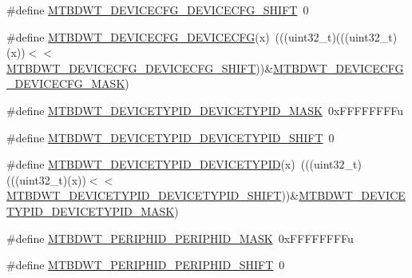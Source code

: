 \begin{DoxyCompactItemize}
\item 
\#define \hyperlink{group___m_t_b_d_w_t___register___masks_ga2194cb4b21ad650bf3957d3f95f4dbbb}{M\+T\+B\+D\+W\+T\+\_\+\+D\+E\+V\+I\+C\+E\+C\+F\+G\+\_\+\+D\+E\+V\+I\+C\+E\+C\+F\+G\+\_\+\+S\+H\+I\+FT}~0
\item 
\#define \hyperlink{group___m_t_b_d_w_t___register___masks_ga9d21c0abbf05163f867fd5f822a182bf}{M\+T\+B\+D\+W\+T\+\_\+\+D\+E\+V\+I\+C\+E\+C\+F\+G\+\_\+\+D\+E\+V\+I\+C\+E\+C\+FG}(x)~(((uint32\+\_\+t)(((uint32\+\_\+t)(x))$<$$<$\hyperlink{group___m_t_b_d_w_t___register___masks_ga2194cb4b21ad650bf3957d3f95f4dbbb}{M\+T\+B\+D\+W\+T\+\_\+\+D\+E\+V\+I\+C\+E\+C\+F\+G\+\_\+\+D\+E\+V\+I\+C\+E\+C\+F\+G\+\_\+\+S\+H\+I\+FT}))\&\hyperlink{group___m_t_b_d_w_t___register___masks_ga90daa5cb85d4d39b819f5c9bc1b20546}{M\+T\+B\+D\+W\+T\+\_\+\+D\+E\+V\+I\+C\+E\+C\+F\+G\+\_\+\+D\+E\+V\+I\+C\+E\+C\+F\+G\+\_\+\+M\+A\+SK})
\item 
\#define \hyperlink{group___m_t_b_d_w_t___register___masks_ga6986bcf237d6ff96e25d6458355ef4b8}{M\+T\+B\+D\+W\+T\+\_\+\+D\+E\+V\+I\+C\+E\+T\+Y\+P\+I\+D\+\_\+\+D\+E\+V\+I\+C\+E\+T\+Y\+P\+I\+D\+\_\+\+M\+A\+SK}~0x\+F\+F\+F\+F\+F\+F\+F\+Fu
\item 
\#define \hyperlink{group___m_t_b_d_w_t___register___masks_ga8caaff8277e4bdaee5735e22d6eb6e7c}{M\+T\+B\+D\+W\+T\+\_\+\+D\+E\+V\+I\+C\+E\+T\+Y\+P\+I\+D\+\_\+\+D\+E\+V\+I\+C\+E\+T\+Y\+P\+I\+D\+\_\+\+S\+H\+I\+FT}~0
\item 
\#define \hyperlink{group___m_t_b_d_w_t___register___masks_gaeb9942e9e9c4c3c52ef545b4d49e113d}{M\+T\+B\+D\+W\+T\+\_\+\+D\+E\+V\+I\+C\+E\+T\+Y\+P\+I\+D\+\_\+\+D\+E\+V\+I\+C\+E\+T\+Y\+P\+ID}(x)~(((uint32\+\_\+t)(((uint32\+\_\+t)(x))$<$$<$\hyperlink{group___m_t_b_d_w_t___register___masks_ga8caaff8277e4bdaee5735e22d6eb6e7c}{M\+T\+B\+D\+W\+T\+\_\+\+D\+E\+V\+I\+C\+E\+T\+Y\+P\+I\+D\+\_\+\+D\+E\+V\+I\+C\+E\+T\+Y\+P\+I\+D\+\_\+\+S\+H\+I\+FT}))\&\hyperlink{group___m_t_b_d_w_t___register___masks_ga6986bcf237d6ff96e25d6458355ef4b8}{M\+T\+B\+D\+W\+T\+\_\+\+D\+E\+V\+I\+C\+E\+T\+Y\+P\+I\+D\+\_\+\+D\+E\+V\+I\+C\+E\+T\+Y\+P\+I\+D\+\_\+\+M\+A\+SK})
\item 
\#define \hyperlink{group___m_t_b_d_w_t___register___masks_gaa49f29267dcedd6db6aafce7b226182b}{M\+T\+B\+D\+W\+T\+\_\+\+P\+E\+R\+I\+P\+H\+I\+D\+\_\+\+P\+E\+R\+I\+P\+H\+I\+D\+\_\+\+M\+A\+SK}~0x\+F\+F\+F\+F\+F\+F\+F\+Fu
\item 
\#define \hyperlink{group___m_t_b_d_w_t___register___masks_gaa9dfe45d3ebe7c1496f24e1b898ae6a5}{M\+T\+B\+D\+W\+T\+\_\+\+P\+E\+R\+I\+P\+H\+I\+D\+\_\+\+P\+E\+R\+I\+P\+H\+I\+D\+\_\+\+S\+H\+I\+FT}~0

\end{DoxyCompactItemize}
